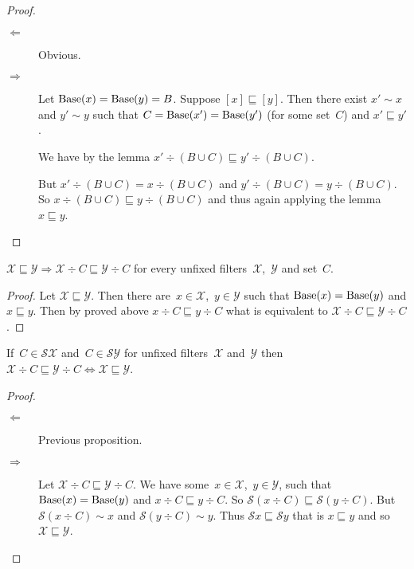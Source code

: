 \begin{proof}
~
\begin{description}
\item[$\Leftarrow$] Obvious.

\item[$\Rightarrow$] Let $\operatorname{Base}(x)=\operatorname{Base}(y)=B$.
Suppose $[x]\sqsubseteq[y]$. Then
there exist $x'\sim x$ and $y'\sim y$ such that
$C=\operatorname{Base}(x')=\operatorname{Base}(y')$ (for some set~$C$) and
$x'\sqsubseteq y'$.

We have by the lemma
$x'\div(B\cup C)\sqsubseteq y'\div(B\cup C)$.

But $x'\div(B\cup C)=x\div(B\cup C)$ and
$y'\div(B\cup C)=y\div(B\cup C)$. So
$x\div(B\cup C)\sqsubseteq y\div(B\cup C)$ and thus again
applying the lemma $x\sqsubseteq y$.
\end{description}
\end{proof}

\begin{prop}
$\mathcal{X}\sqsubseteq\mathcal{Y} \Rightarrow
\mathcal{X}\div C\sqsubseteq\mathcal{Y}\div C$ for every
unfixed filters~$\mathcal{X}$,~$\mathcal{Y}$ and set~$C$.
\end{prop}

\begin{proof}
Let $\mathcal{X}\sqsubseteq\mathcal{Y}$. Then there
are~$x\in\mathcal{X}$,~$y\in\mathcal{Y}$ such that
$\operatorname{Base}(x)=\operatorname{Base}(y)$ and $x\sqsubseteq y$.
Then by proved above $x\div C\sqsubseteq y\div C$ what is
equivalent to
$\mathcal{X}\div C\sqsubseteq\mathcal{Y}\div C$.
\end{proof}

\begin{prop}
If~$C\in\mathscr{S}\mathcal{X}$
and~$C\in\mathscr{S}\mathcal{Y}$ for unfixed
filters~$\mathcal{X}$ and~$\mathcal{Y}$ then
$\mathcal{X}\div C\sqsubseteq\mathcal{Y}\div C \Leftrightarrow
\mathcal{X}\sqsubseteq\mathcal{Y}$.
\end{prop}

\begin{proof}
~
\begin{description}
\item[$\Leftarrow$] Previous proposition.

\item[$\Rightarrow$] Let
$\mathcal{X}\div C\sqsubseteq\mathcal{Y}\div C$.
We have some~$x\in\mathcal{X}$,~$y\in\mathcal{Y}$,
such that $\operatorname{Base}(x)=\operatorname{Base}(y)$ and
$x\div C\sqsubseteq y\div C$.
So $\mathscr{S}(x\div C)\sqsubseteq\mathscr{S}(y\div C)$.
But $\mathscr{S}(x\div C)\sim x$ and
$\mathscr{S}(y\div C)\sim y$. Thus
$\mathscr{S}x\sqsubseteq\mathscr{S}y$ that is
$x\sqsubseteq y$ and so
$\mathcal{X}\sqsubseteq\mathcal{Y}$.
\end{description}
\end{proof}

